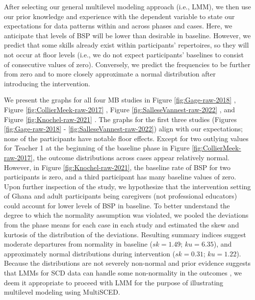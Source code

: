 \documentclass[
]{book}
\begin{document}
After selecting our general multilevel modeling approach (i.e., LMM), we then use our prior knowledge and experience with the dependent variable to state our expectations for data patterns within and across phases and cases. Here, we anticipate that levels of BSP will be lower than desirable in baseline. However, we predict that some skills already exist within participants' repertoires, so they will not occur at floor levels (i.e., we do not expect participants' baselines to consist of consecutive values of zero). Conversely, we predict the frequencies to be further from zero and to more closely approximate a normal distribution after introducing the intervention.

We present the graphs for all four MB studies in Figure \ref{fig:Gage-raw-2018} \citep{Gage2018}, Figure \ref{fig:CollierMeek-raw-2017} \citep{CollierMeek2017}, Figure \ref{fig:SalleseVannest-raw-2022} \citep{Sallese_Vannest_2022}, and Figure \ref{fig:Knochel-raw-2021} \citep{knochel2021culturally}. The graphs for the first three studies (Figures \ref{fig:Gage-raw-2018} - \ref{fig:SalleseVannest-raw-2022}) align with our expectations; none of the participants have notable floor effects. Except for two outlying values for Teacher 1 at the beginning of the baseline phase in Figure \ref{fig:CollierMeek-raw-2017}, the outcome distributions across cases appear relatively normal. However, in Figure \ref{fig:Knochel-raw-2021}, the baseline rate of BSP for two participants is zero, and a third participant has many baseline values of zero. Upon further inspection of the \citet{knochel2021culturally} study, we hypothesize that the intervention setting of Ghana and adult participants being caregivers (not professional educators) could account for lower levels of BSP in baseline. To better understand the degree to which the normality assumption was violated, we pooled the deviations from the phase means for each case in each study and estimated the skew and kurtosis of the distribution of the deviations. Resulting summary indices suggest moderate departures from normality in baseline (\(sk = 1.49\); \(ku = 6.35\)), and approximately normal distributions during intervention (\(sk = 0.31\); \(ku = 1.22\)). Because the distributions are not severely non-normal and prior evidence suggests that LMMs for SCD data can handle some non-normality in the outcomes \citep{Declercq2019, Joo_Ferron_2019}, we deem it appropriate to proceed with LMM for the purpose of illustrating multilevel modeling using MultiSCED.
\end{document}
